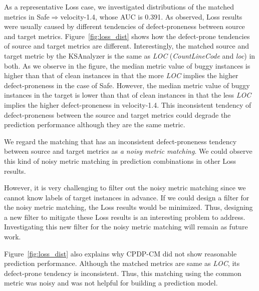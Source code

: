 As a representative Loss case, we investigated distributions of the matched metrics in Safe$\Rightarrow$velocity-1.4, whose AUC is 0.391.
As observed, Loss results were usually caused by different tendencies of
defect-proneness between source and target metrics. Figure~\ref{fig:loss_dist}
shows how the defect-prone tendencies of source and target metrics are different.
Interestingly, the matched source and target metric by the KSAnalyzer is the
same as {\em LOC} ({\em CountLineCode} and {\em loc}) in both.
As we observe in the figure, the median metric value of buggy instances is higher than that of clean instances in that the more {\em LOC}
implies the higher defect-proneness in the case of Safe. However, the median metric value of
buggy instances in the target is lower than that of clean instances
in that the less {\em LOC} implies the higher defect-proneness in
velocity-1.4. This inconsistent tendency of
defect-proneness between the source and target metrics could degrade the
prediction performance although they are the same metric.

We regard the matching that has an inconsistent defect-proneness tendency between
source and target metrics as {\em a noisy metric matching}.
We could observe this kind of noisy metric matching in
prediction combinations in other Loss results.

However, it is very challenging to filter out the noisy metric matching since we
cannot know labels of target instances in
advance. If we could design a filter for the noisy metric matching, the Loss
results would be minimized. Thus, designing a new filter to mitigate these Loss
results is an interesting problem to address. Investigating this new filter
for the noisy metric matching will remain as future work.

Figure~\ref{fig:loss_dist} also explains why CPDP-CM did not show reasonable
prediction performance. Although the matched metrics are same
as {\em LOC}, its defect-prone tendency is inconsistent. Thus, this matching using
the common metric was noisy and was not helpful for building a prediction model.




